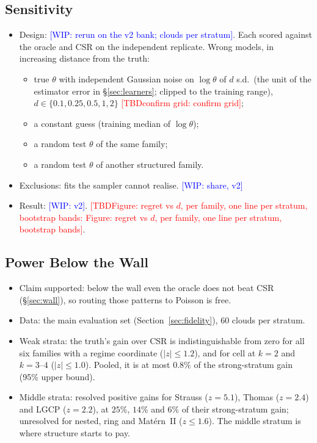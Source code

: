 \documentclass[twoside]{article}
\newcommand{\TBD}[1]{\textcolor{red}{[TBD\ifx\relax#1\relax\else: #1\fi]}}
\newcommand{\WIP}[1]{\textcolor{blue}{[WIP: #1]}}
\begin{document}
\subsection{Sensitivity}
\label{app:score-ladder}

\begin{itemize}
  \item Design: \WIP{rerun on the v2 bank; clouds per stratum}. Each scored against the oracle and CSR on the
        independent replicate. Wrong models, in increasing distance from the truth:
  \begin{itemize}
    \item true $\theta$ with independent Gaussian noise on $\log\theta$ of $d$ s.d.\ (the unit of the estimator
          error in \S\ref{sec:learners}; clipped to the training range), $d\in\{0.1,0.25,0.5,1,2\}$
          \TBD{confirm grid};
    \item a constant guess (training median of $\log\theta$);
    \item a random test $\theta$ of the same family;
    \item a random test $\theta$ of another structured family.
  \end{itemize}
  \item Exclusions: fits the sampler cannot realise. \WIP{share, v2}
  \item Result: \WIP{v2}. \TBD{Figure: regret vs $d$, per family, one line per stratum, bootstrap bands}.
\end{itemize}

\subsection{Power Below the Wall}
\label{app:score-power}

\begin{itemize}
  \item Claim supported: below the wall even the oracle does not beat CSR (\S\ref{sec:wall}), so routing those
        patterns to Poisson is free.
  \item Data: the main evaluation set (Section~\ref{sec:fidelity}), $60$ clouds per stratum.
  \item Weak strata: the truth's gain over CSR is indistinguishable from zero for all six families with a regime
        coordinate ($|z|\le1.2$), and for cell at $k=2$ and $k=3$--$4$ ($|z|\le1.0$). Pooled, it is at most $0.8\%$ of
        the strong-stratum gain (95\% upper bound).
  \item Middle strata: resolved positive gains for Strauss ($z=5.1$), Thomas ($z=2.4$) and LGCP ($z=2.2$), at
        $25\%$, $14\%$ and $6\%$ of their strong-stratum gain; unresolved for nested, ring and Mat\'ern~II
        ($z\le1.6$). The middle stratum is where structure starts to pay.
\end{itemize}
\end{document}
